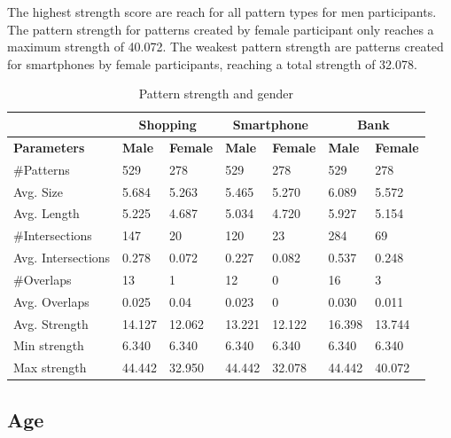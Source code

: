     The highest strength score are reach for all pattern types for men participants. The pattern strength for patterns created by female participant only reaches a maximum strength of 40.072. The weakest pattern strength are patterns created for smartphones by female participants, reaching a total strength of 32.078. 

    \begin{table}[H]
      \centering
      \begin{tabular}{l || l | l || l | l || l | l }
        \hline
         & \multicolumn{2}{c||}{\bf Shopping} & \multicolumn{2}{c||}{\bf Smartphone} &\multicolumn{2}{c}{\bf Bank} \\ \hline
        {\bf Parameters}   & {\bf Male} & {\bf Female} & {\bf Male} & {\bf Female} & {\bf Male} & {\bf Female}\\ \hline
        \#Patterns         & 529    & 278    & 529    & 278    & 529    & 278    \\
        Avg. Size          & 5.684  & 5.263  & 5.465  & 5.270  & 6.089  & 5.572  \\
        Avg. Length        & 5.225  & 4.687  & 5.034  & 4.720  & 5.927  & 5.154  \\
        \#Intersections    & 147    & 20     & 120    & 23     & 284    & 69     \\
        Avg. Intersections & 0.278  & 0.072  & 0.227  & 0.082  & 0.537  & 0.248  \\
        \#Overlaps         & 13     & 1      & 12     & 0      & 16     & 3      \\
        Avg. Overlaps      & 0.025  & 0.04   & 0.023  & 0      & 0.030  & 0.011  \\ \hline
        Avg. Strength      & 14.127 & 12.062 & 13.221 & 12.122 & 16.398 & 13.744 \\ 
        Min strength       & 6.340  & 6.340  & 6.340  & 6.340  & 6.340  & 6.340  \\
        Max strength       & 44.442 & 32.950  & 44.442 & 32.078 & 44.442 & 40.072 \\ \hline
      \end{tabular}
      \caption{Pattern strength and gender }
      \label{tab:gendertrength}
    \end{table}

	\subsection{Age}

